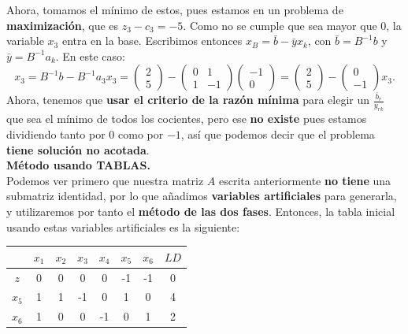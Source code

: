 \documentclass[11pt,table]{article}
\begin{document}
    Ahora, tomamos el mínimo de estos, pues estamos en un problema de \textbf{maximización}, que es \(z_3 - c_3 = -5\). Como no se cumple que sea mayor que \(0\), la variable \(x_3\) entra en la base. Escribimos entonces \(x_B = \bar b - \bar y x_k\), con \(\bar b = B^{-1}b\) y \(\bar y = B^{-1}a_k\). En este caso:
    \[
    x_3 = B^{-1}b - B^{-1}a_3 x_3 = \begin{pmatrix} 2 \\ 5 \end{pmatrix} - \begin{pmatrix} 0 & 1 \\ 1 & -1 \end{pmatrix} \begin{pmatrix} -1 \\ 0 \end{pmatrix} = \begin{pmatrix} 2 \\ 5 \end{pmatrix} - \begin{pmatrix} 0 \\ -1 \end{pmatrix}x_3.
    \]
    Ahora, tenemos que \textbf{usar el criterio de la razón mínima} para elegir un \(\frac{\bar b_r}{y_{rk}}\) que sea el mínimo de todos los cocientes, pero ese \textbf{no existe} pues estamos dividiendo tanto por \(0\) como por \(-1\), así que podemos decir que el problema \textbf{tiene solución no acotada}.\\

    \textbf{Método usando TABLAS.}\\

    Podemos ver primero que nuestra matriz \(A\) escrita anteriormente \textbf{no tiene} una submatriz identidad, por lo que añadimos \textbf{variables artificiales} para generarla, y utilizaremos por tanto el \textbf{método de las dos fases}. Entonces, la tabla inicial usando estas variables artificiales es la siguiente:

    \begin{table}[H]
        \centering
        \begin{tabular}{c|cccccc|c}
              & $x_1$ & $x_2$ & $x_3$ & $x_4$ & $x_5$ & $x_6$ & $LD$ \\ \hline
        $z$   & 0     & 0     & 0     & 0     & -1    & -1    & 0    \\
        $x_5$ & 1     & 1     & -1     & 0     & 1     & 0     & 4    \\
        $x_6$ & 1     & 0     & 0     & -1     & 0     & 1     & 2   
    \end{tabular}
    \end{table}
\end{document}
